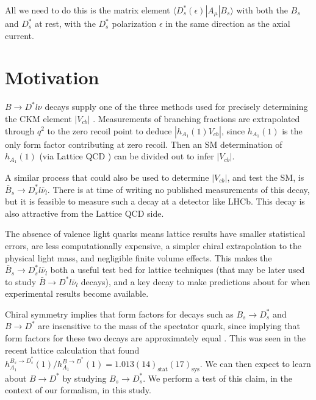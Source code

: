 All we need to do this is the matrix element $\langle D^*_s(\epsilon)| A_{\mu} | B_s \rangle$ with both the $B_s$ and $D_s^*$ at rest, with the $D_s^*$ polarization $\epsilon$ in the same direction as the axial current.

\section{Motivation}
\label{sec:BsDsstar_intro}

$B\to D^{*} l \nu$ decays supply one of the three methods used for precisely determining the CKM element $|V_{cb}|$ \cite{Schroder:1994aj,PhysRevLett.64.2117,PhysRevD.43.651,ALBRECHT1992195,Barish:1994mu,BUSKULIC1996449,Buskulic:1994dz,Abbiendi:2000hk,Abreu:2001ic,Adam:2002uw,Abdallah:2004rz,Aubert:2007rs,Aubert:2007qs,Aubert:2008yv,Dungel:2010uk,Abdesselam:2017kjf,Bailey:2014tva,Abdesselam:2018nnh}.
Measurements of branching fractions are extrapolated through $q^2$ to the zero recoil point to deduce $|h_{A_1}(1)V_{cb}|$, since $h_{A_1}(1)$ is the only form factor contributing at zero recoil. Then an SM determination of $h_{A_1}(1)$ (via Lattice QCD \cite{Bailey:2014tva,Harrison:2017fmw}) can be divided out to infer $|V_{cb}|$.

A similar process that could also be used to determine $|V_{cb}|$, and test the SM, is $\bar{B}_s \to D^*_s l\bar{\nu}_l$. There is at time of writing no published measurements of this decay, but it is feasible to measure such a decay at a detector like LHCb. This decay is also attractive from the Lattice QCD side.

The absence of valence light quarks means lattice results have smaller statistical errors, are less computationally expensive, a simpler chiral extrapolation to the physical light mass, and negligible finite volume effects. This makes the $\bar{B}_s \to D^*_s l\bar{\nu}_l$ both a useful test bed for lattice techniques (that may be later used to study $\bar{B} \to D^* l \bar{\nu}_l$ decays), and a key decay to make predictions about for when experimental results become available.

Chiral symmetry implies that form factors for decays such as $B_s \to D^*_s$ and $B \to D^*$ are insensitive to the mass of the spectator quark, since  implying that form factors for these two decays are approximately equal \cite{Laiho:2005ue}. This was seen in the recent lattice calculation \cite{Harrison:2017fmw} that found $h_{A_1}^{B_s\to D_s^*}(1) / h_{A_1}^{B\to D^*}(1) = 1.013(14)_{\text{stat}}(17)_{\text{sys}}$. We can then expect to learn about $B\to D^*$ by studying $B_s\to D_s^*$. We perform a test of this claim, in the context of our formalism, in this study.

